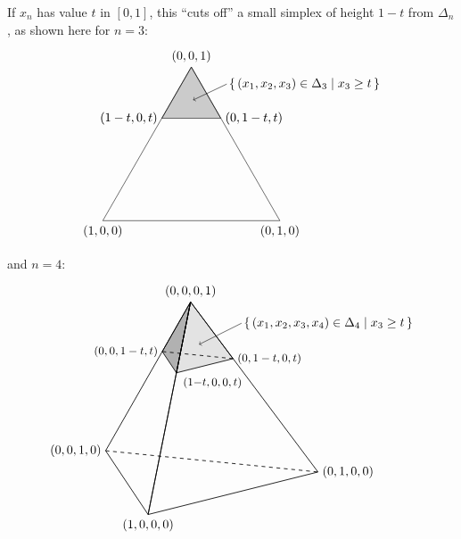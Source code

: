 \documentclass[a4paper,12pt]{article}  %
\theoremstyle{definition}
\newcommand{\0}{{\mathbf0}}
\newcommand{\1}{{\mathbf1}}
\begin{document}
If $x_n$ has value $t$ in $[0,1]$, this ``cuts off''
a small simplex of height $1-t$ from $\Delta_n$, as shown here
for $n=3$:
\[
\begin{tikzpicture}[scale=5]
\draw [join=round] (-.5,0) node[below] {$(1,0,0)$}
   -- (.5,0) node[below] {$(0,1,0)$} 
   -- (0,.866) node[above] {$(0,0,1)$} -- cycle;
\draw [fill=black, fill opacity=0.2,join=round] 
   (-0.1666,0.5773) node[left] {$(1-t,0,t)$}
   -- (0.1666,0.5773) node[right] {$(0,1-t,t)$}
   -- (0,.866) -- cycle;
\draw [] (-0.1666,0.5773) node[left] {$(1-t,0,t)$};
\draw [] (0.1666,0.5773) node[right] {$(0,1-t,t)$};
\draw [<-] (0.01,0.68) -- (0.2,0.77) node[right]
{\!\{\,$(x_1,x_2,x_3)\in\Delta_3\mid x_3\ge t\,\}$};
\end{tikzpicture}
\]
and $n=4$:
\[
\begin{tikzpicture}[scale=1.2]
\draw [semithick, join=round] (0,3) -- (-2,-.5) -- (-1,-2) -- cycle;
\draw [semithick, join=round] (0,3) -- (3,-1) -- (-1,-2) -- cycle; 
\draw [semithick, draw=black, fill=black, fill opacity=0.3,join=round] (0,3)
   -- (-.6666,1.8333)
   -- (-.333,1.333)
   -- cycle;
\draw [semithick, draw=black, fill=black, fill opacity=0.1,join=round] (0,3)
   -- (1,1.666) 
   -- (-.333,1.333)
   -- cycle;
\draw [dashed,semithick] (1,1.666) -- (-.6666,1.8333) ;
\draw [dashed,semithick] (-2,-.5) -- (3,-1);
\draw (-1,-2) node[below] {$(1,0,0,0)$};
\draw (3,-1)  node[right] {$(0,1,0,0)$};
\draw (-2,-.5) node[left] {$(0,0,1,0)$};
\draw (0,3)  node[above] {$(0,0,0,1)$};
\draw (-.6666,1.8333) node [left] {\small$(0,0,1-t,t)$};
\draw (1,1.666) node [right] {\small$(0,1-t,0,t)$};
\draw (-.333,1.333) node [below,xshift=29] {\small$(1{-}t,0,0,t)$};
\draw [<-] (0.2,2.0) -- (1.2,2.5) node[right]
{\!\{\,$(x_1,x_2,x_3,x_4)\in\Delta_4\mid x_3\ge t\,\}$};
\end{tikzpicture}
\]
\end{document}
